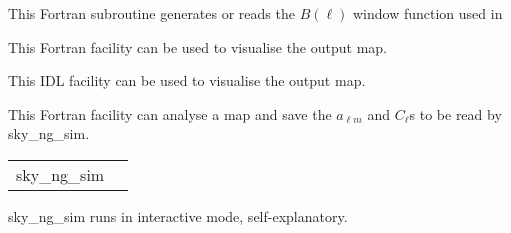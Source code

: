 \begin{support}
  \begin{sulist}{} %
  \item[\htmlref{generate\_beam}{sub:generate_beam}] This \healpix Fortran
subroutine generates or reads the $B(\ell)$ window function used in \thedocid
  \item[\htmlref{map2gif}{fac:map2gif}] This \healpix Fortran facility can be used to visualise the
  output map.
  \item[\htmlref{mollview}{idl:mollview}] This \healpix IDL facility can be used to visualise the
  output map.
  \item[\htmlref{anafast}{fac:anafast}] This \healpix Fortran facility can analyse a \healpix map and 
     	       save the $a_{\ell m}$ and $C_\ell$s to be read by sky\_ng\_sim.
		
  \end{sulist}
\end{support}

\begin{examples}{1}
{
\begin{tabular}{ll} %
sky\_ng\_sim  \\
\end{tabular}
}
{
sky\_ng\_sim runs in interactive mode, self-explanatory.
}
\end{examples}


